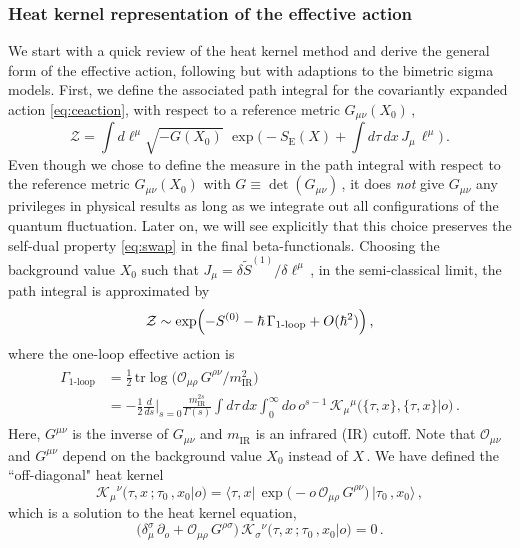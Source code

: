 \documentclass[11pt]{article}
\newcommand{\be}{\begin{equation}}
\newcommand{\ee}{\end{equation}}
\newcommand{\CK}{\mathcal{K}}
\newcommand{\CO}{\mathcal{O}}
\newcommand{\CZ}{\mathcal{Z}}
\newcommand{\p}{\partial}
\renewcommand{\tilde}[1]{\widetilde{#1}}
\newcommand{\tr}{\text{tr}}
\begin{document}
\subsubsection{Heat kernel representation of the effective action}

We start with a quick review of the heat kernel method and derive the general form of the effective action, following \cite{seeley1967complex, Gilkey:1975iq, Gusynin:1989ky, Vassilevich:2003xt, Grosvenor:2021zvq} but with adaptions to the bimetric sigma models.
%
First, we define the associated path integral for the covariantly expanded action \eqref{eq:ceaction}, with respect to a reference metric $G_{\mu\nu} (X_0)$\,,
%
\be
	\CZ = \int d \ell^\mu \sqrt{- G(X_0)} \,\, \exp \biggl(- S_\text{E} (X) + \int d\tau \, dx \, J_\mu \, \ell^\mu \biggr)\,.
\ee
%
Even though we chose to define the measure in the path integral with respect to the reference metric $G_{\mu\nu}(X_0)$ with $G \equiv \det (G_{\mu\nu})$\,, it does \emph{not} give $G_{\mu\nu}$ any privileges in physical results as long as we integrate out all configurations of the quantum fluctuation. Later on, we will see explicitly that this choice preserves the self-dual property \eqref{eq:swap} in the final beta-functionals.
Choosing the background value $X_0$ such that $J_\mu = \delta \tilde{S}^{(1)} / \delta \ell^\mu$\,, in the semi-classical limit, the path integral is approximated by
%
\begin{align}
	\CZ %
		\sim \exp \Bigl( - S^{(0)} - \hbar \, \Gamma_\text{1-loop} + O(\hbar^2) \Bigr)\,,
\end{align}
%
where the one-loop effective action is
%
\begin{align} \label{eq:Gamma1}
\begin{split}
	\Gamma_\text{1-loop} & = \frac{1}{2} \, \tr \log \bigl( \CO_{\mu\rho} \, G^{\rho\nu} / m^2_\text{IR} \bigr) \\[2pt]
		& = - \frac{1}{2} \frac{d}{ds} \bigg|_{s=0} \frac{m_\text{IR}^{2s}}{\Gamma(s)} \int d\tau \, dx \int_0^\infty do \, o^{s-1} \, \CK_\mu{}^\mu \bigl(\{\tau, x\}, \{\tau, x\} \big| o\bigr)\,.
\end{split}
\end{align}
%
Here, $G^{\mu\nu}$ is the inverse of $G_{\mu\nu}$ and $m^{}_\text{IR}$ is an infrared (IR) cutoff. Note that $\CO_{\mu\nu}$ and $G^{\mu\nu}$ depend on the background value $X_0$ instead of $X$\,. We have defined the ``off-diagonal" heat kernel
%
\be \label{eq:hk}
	\CK_{\mu}{}^{\nu} \bigl(\tau, x\,; \tau_0\,, x_0 \big| o\bigr) = \bigl\langle \tau, x \bigl| \, \exp \bigl( - o \, \CO_{\mu\rho} \, G^{\rho\nu} \bigr) \, \bigr| \tau_0\,, x_0 \bigr\rangle\,,
\ee
%
which is a solution to the heat kernel equation, 
%
\be
	\bigl( \delta_\mu^\sigma \, \p_o + \CO_{\mu\rho} \, G^{\rho\sigma} \bigr) \, \CK_{\sigma}{}^{\nu} \bigl(\tau, x\,; \tau_0\,, x_0 \big| o\bigr) = 0\,.
\ee
\end{document}
